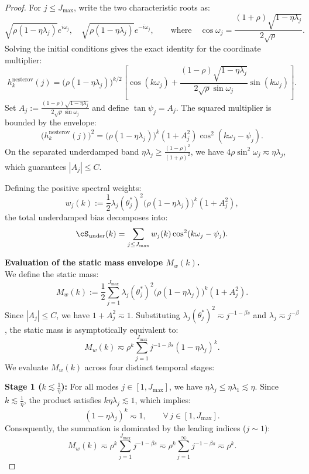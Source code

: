 \documentclass[11pt]{article}
\newcommand{\nesterov}{\mathrm{nesterov}}
\begin{document}
\begin{proof}
For $j \le J_{\max}$, write the two characteristic roots as:
\[
    \sqrt{\rho(1-\eta\lambda_j)}e^{i\omega_j},
    \quad
    \sqrt{\rho(1-\eta\lambda_j)}e^{-i\omega_j},
    \qquad \text{where} \quad
    \cos \omega_j=\frac{(1+\rho)\sqrt{1-\eta\lambda_j}}{2\sqrt \rho}.
\]
Solving the initial conditions gives the exact identity for the coordinate multiplier:
\begin{equation*}
    h_k^{\nesterov}(j)
    =\bigl(\rho(1-\eta\lambda_j)\bigr)^{k/2}
    \left[
        \cos(k\omega_j)
        +\frac{(1-\rho)\sqrt{1-\eta\lambda_j}}{2\sqrt{\rho}\sin \omega_j}
        \sin(k\omega_j)
    \right].
\end{equation*}
Set $A_j:=\frac{(1-\rho)\sqrt{1-\eta\lambda_j}}{2\sqrt{\rho}\sin \omega_j}$ and define $\tan\psi_j = A_j$. The squared multiplier is bounded by the envelope:
\[
    \bigl(h_k^{\nesterov}(j)\bigr)^2 = \bigl(\rho(1-\eta\lambda_j)\bigr)^k (1+A_j^2) \cos^2(k\omega_j - \psi_j).
\]
On the separated underdamped band $\eta\lambda_j \ge \frac{(1-\rho)^2}{(1+\rho)^2}$, we have $4\rho\sin^2\omega_j \eqsim \eta\lambda_j$, which guarantees $|A_j| \le C$.

Defining the positive spectral weights:
\[
    w_j(k) := \frac{1}{2}\lambda_j (\theta_j^*)^2 \bigl(\rho(1-\eta\lambda_j)\bigr)^k (1+A_j^2),
\]
the total underdamped bias decomposes into:
\[
    \cS_{\mathrm{under}}(k) = \sum_{j \le J_{\max}} w_j(k) \cos^2(k\omega_j - \psi_j).
\]

\medskip
\noindent\textbf{Evaluation of the static mass envelope $M_w(k)$.}\\

We define the static mass:
\[
    M_w(k) := \frac{1}{2}\sum_{j=1}^{J_{\max}} \lambda_j (\theta_j^*)^2 \bigl(\rho(1-\eta\lambda_j)\bigr)^k (1+A_j^2).
\]
Since $|A_j| \le C$, we have $1+A_j^2 \eqsim 1$. Substituting $\lambda_j (\theta_j^*)^2 \eqsim j^{-1-\beta s}$ and $\lambda_j \eqsim j^{-\beta}$, the static mass is asymptotically equivalent to:
\[
    M_w(k) \eqsim \rho^k \sum_{j=1}^{J_{\max}} j^{-1-\beta s} (1-\eta\lambda_j)^k.
\]
We evaluate $M_w(k)$ across four distinct temporal stages:

\medskip
\noindent\textbf{Stage 1 ($k \lesssim \frac{1}{\eta}$):}
For all modes $j \in [1, J_{\max}]$, we have $\eta\lambda_j \le \eta\lambda_1 \lesssim \eta$. Since $k \lesssim \frac{1}{\eta}$, the product satisfies $k \eta \lambda_j \lesssim 1$, which implies:
\[
    (1-\eta\lambda_j)^k \eqsim 1, \qquad \forall\, j \in [1, J_{\max}].
\]
Consequently, the summation is dominated by the leading indices ($j \sim 1$):
\[
    M_w(k) \eqsim \rho^k \sum_{j=1}^{J_{\max}} j^{-1-\beta s} \eqsim \rho^k \sum_{j=1}^{\infty} j^{-1-\beta s} \eqsim \rho^k.
\]


\end{proof}
\end{document}
